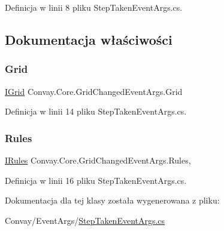 Definicja w linii 8 pliku Step\+Taken\+Event\+Args.\+cs.



\subsection{Dokumentacja właściwości}
\hypertarget{class_convay_1_1_core_1_1_grid_changed_event_args_ac9ca2bcbf1c6ab31c34c2b5c93729e4b}{}\label{class_convay_1_1_core_1_1_grid_changed_event_args_ac9ca2bcbf1c6ab31c34c2b5c93729e4b} 
\subsubsection{\texorpdfstring{Grid}{Grid}}
{\footnotesize\ttfamily \hyperlink{interface_convay_1_1_core_1_1_interfaces_1_1_i_grid}{I\+Grid} Convay.\+Core.\+Grid\+Changed\+Event\+Args.\+Grid\hspace{0.3cm}{\ttfamily [get]}}



Definicja w linii 14 pliku Step\+Taken\+Event\+Args.\+cs.

\hypertarget{class_convay_1_1_core_1_1_grid_changed_event_args_a83432f38359321c05d8a19d54be4bb7d}{}\label{class_convay_1_1_core_1_1_grid_changed_event_args_a83432f38359321c05d8a19d54be4bb7d} 
\subsubsection{\texorpdfstring{Rules}{Rules}}
{\footnotesize\ttfamily \hyperlink{interface_convay_1_1_core_1_1_interfaces_1_1_i_rules}{I\+Rules} Convay.\+Core.\+Grid\+Changed\+Event\+Args.\+Rules\hspace{0.3cm}{\ttfamily [get]}, {\ttfamily [set]}}



Definicja w linii 16 pliku Step\+Taken\+Event\+Args.\+cs.



Dokumentacja dla tej klasy została wygenerowana z pliku\+:\begin{DoxyCompactItemize}
\item 
Convay/\+Event\+Args/\hyperlink{_step_taken_event_args_8cs}{Step\+Taken\+Event\+Args.\+cs}\end{DoxyCompactItemize}
